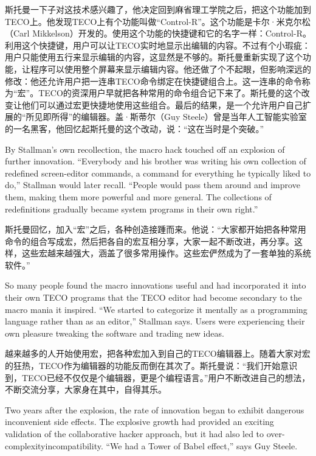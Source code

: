\fi
\ifdefined\vtwo
斯托曼一下子对这技术感兴趣了，他决定回到麻省理工学院之后，把这个功能加到TECO上。他发现TECO上有个功能叫做``Control-R''。这个功能是卡尔·米克尔松（Carl Mikkelson）开发的。使用这个功能的快捷键和它的名字一样：Control-R。利用这个快捷键，用户可以让TECO实时地显示出编辑的内容。不过有个小瑕疵：用户只能使用五行来显示编辑的内容，这显然是不够的。斯托曼重新实现了这个功能，让程序可以使用整个屏幕来显示编辑内容。他还做了个不起眼，但影响深远的修改：他还允许用户把一连串TECO命令绑定在快捷键组合上。这一连串的命令称为``宏''。TECO的资深用户早就把各种常用的命令组合记下来了。斯托曼的这个改变让他们可以通过宏更快捷地使用这些组合。最后的结果，是一个允许用户自己扩展的``所见即所得''的编辑器。盖·斯蒂尔（Guy Steele）曾是当年人工智能实验室的一名黑客，他回忆起斯托曼的这个改动，说：``这在当时是个突破。''
\fi
\fi

\ifdefined\eng
By Stallman's own recollection, the macro hack touched off an explosion of further innovation. ``Everybody and his brother was writing his own collection of redefined screen-editor commands, a command for everything he typically liked to do,'' Stallman would later recall. ``People would pass them around and improve them, making them more powerful and more general. The collections of redefinitions gradually became system programs in their own right.''
\fi

\ifdefined\chs
斯托曼回忆，加入``宏''之后，各种创造接踵而来。他说：``大家都开始把各种常用命令的组合写成宏，然后把各自的宏互相分享，大家一起不断改进，再分享。这样，这些宏越来越强大，涵盖了很多常用操作。这些宏俨然成为了一套单独的系统软件。''
\fi

\ifdefined\eng
So many people found the macro innovations useful and had incorporated it into their own TECO programs that the TECO editor had become secondary to the macro mania it inspired. ``We started to categorize it mentally as a programming language rather than as an editor,'' Stallman says. Users were experiencing their own pleasure tweaking the software and trading new ideas.
\fi

\ifdefined\chs
越来越多的人开始使用宏，把各种宏加入到自己的TECO编辑器上。随着大家对宏的狂热，TECO作为编辑器的功能反而倒在其次了。斯托曼说：``我们开始意识到，TECO已经不仅仅是个编辑器，更是个编程语言。''用户不断改进自己的想法，不断交流分享，大家身在其中，自得其乐。
\fi

\ifdefined\eng
Two years after the explosion, the rate of innovation began to exhibit \ifdefined\vone dangerous \fi\ifdefined\vtwo inconvenient \fi side effects. The explosive growth had provided an exciting validation of the collaborative hacker approach, but it had also led to \ifdefined\vone over-complexity\fi\ifdefined\vtwo incompatibility\fi . ``We had a Tower of Babel effect,'' says Guy Steele.
\fi


